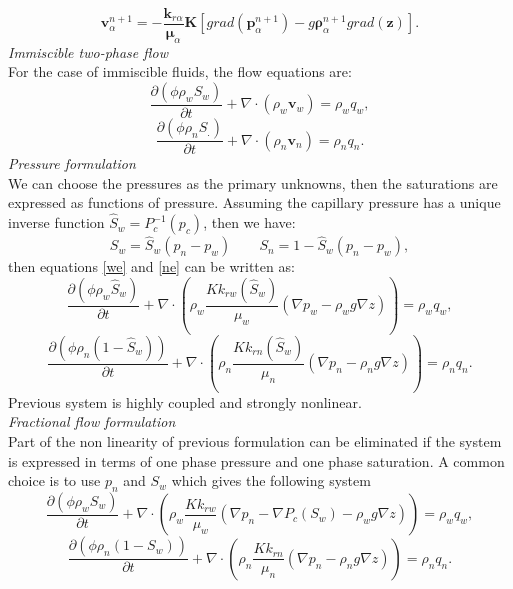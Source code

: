 \documentclass[a4paper,10pt]{report}
\begin{document}
\begin{equation*}
\mathbf{v}_{\alpha}^{n+1}=-\frac{\mathbf{k}_{r\alpha}}{\mathbf{\mu}_{\alpha}} \mathbf{K}[grad( \mathbf{p}_{\alpha}^{n+1})-g\mathbf{\rho}_{\alpha}^{n+1}  grad(\mathbf{z})].
\end{equation*}
\emph{Immiscible two-phase flow}\\
For the case of immiscible fluids, the flow equations are:
\begin{equation}\label{we}
 \frac{\partial(\phi \rho_{w}S_{w})}{\partial t}+\nabla \cdot ( \rho_{w} \mathbf{v}_{w})=\rho_{w} q_{w},
\end{equation}
\begin{equation}\label{ne}
 \frac{\partial(\phi \rho_{n}S_{.})}{\partial t}+\nabla \cdot ( \rho_{n} \mathbf{v}_{n})=\rho_{n} q_{n}.
\end{equation}
\emph{Pressure formulation}\\
We can choose the pressures as the primary unknowns, then the saturations are expressed as functions of pressure. 
Assuming the capillary pressure has a unique inverse function $\hat{S}_w=P_c^{-1}(p_c)$, then we have:
$$S_w=\hat{S}_w(p_n-p_w)\qquad S_n=1-\hat{S}_w(p_n-p_w), $$
then equations \eqref{we} and \eqref{ne} can be written as:
\begin{equation}
 \frac{\partial(\phi \rho_{w}\hat{S}_{w})}{\partial t}+\nabla \cdot ( \rho_{w} \frac{{K}k_{rw}(\hat{S}_w)}{\mu_w}(\nabla p_w-\rho_w g \nabla z))=\rho_{w} q_{w},
\end{equation}
\begin{equation}
 \frac{\partial(\phi \rho_{n}(1-\hat{S}_{w}))}{\partial t}+\nabla \cdot ( \rho_{n} \frac{{K}k_{rn}(\hat{S}_w)}{\mu_n}(\nabla p_n-\rho_n g \nabla z))=\rho_{n} q_{n}.
\end{equation}
Previous system is highly coupled and strongly nonlinear. \\
\emph{Fractional flow formulation}\\
Part of the non linearity of previous formulation can be eliminated if the system is expressed in terms of one phase pressure and one phase saturation. A common choice is to use $p_n$ and $S_w$ which gives the following system
\begin{equation}
 \frac{\partial(\phi \rho_{w}{S}_{w})}{\partial t}+\nabla \cdot ( \rho_{w} \frac{{K}k_{rw}}{\mu_w}(\nabla p_n-\nabla P_c(S_w)-\rho_w g \nabla z))=\rho_{w} q_{w},
\end{equation}
\begin{equation}
 \frac{\partial(\phi \rho_{n}(1-{S}_{w}))}{\partial t}+\nabla \cdot ( \rho_{n} \frac{{K}k_{rn}}{\mu_n}(\nabla p_n-\rho_n g \nabla z))=\rho_{n} q_{n}.
\end{equation}
\end{document}
